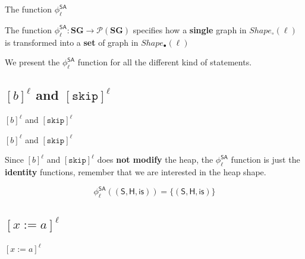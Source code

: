 \documentclass[xcolor=svgnames,11pt]{beamer}
\begin{document}
\begin{frame}{The function ${\phi}_\ell^{\mathsf{SA}}$}

The function ${\phi}_\ell^{\mathsf{SA}} : \mathbf{SG} \rightarrow \mathcal{P}(\mathbf{SG})$ specifies how a \textbf{single} graph in $Shape_{\circ}(\ell)$ is transformed into a \textbf{set} of graph in $Shape_{\bullet}(\ell)$

\medskip
\pause

We present the ${\phi}_\ell^{\mathsf{SA}}$ function for all the different kind of statements.

\end{frame}

\subsection{$[b]^\ell$ and $[\mathtt{skip}]^\ell$}

\begin{frame}{}
\begin{center}
\begin{huge}
\textcolor{bl}{$[b]^\ell$ and $[\mathtt{skip}]^\ell$}
\end{huge}
\end{center}
\end{frame}

\begin{frame}{$[b]^\ell$ and $[\mathtt{skip}]^\ell$}

Since $[b]^\ell$ and $[\mathtt{skip}]^\ell$ does \textbf{not modify} the heap, the ${\phi}_\ell^{\mathsf{SA}}$ function is just the \textbf{identity} functions, remember that we are interested in the heap shape.

\medskip
\pause

$${\phi}_\ell^{\mathsf{SA}}\mathsf{((S,H,is))} = \mathsf{ \{ (S,H,is) \} }$$

\end{frame}


\subsection{$[x:=a]^\ell$}

\begin{frame}{}
\begin{center}
\begin{huge}
\textcolor{bl}{$[x:=a]^\ell$}
\end{huge}
\end{center}
\end{frame}
\end{document}
